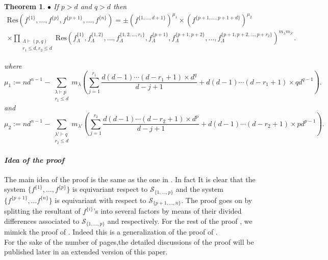 \documentclass[12pt,a4paper,reqno]{amsart}
\newtheorem{theorem}{Theorem}[section]
\theoremstyle{definition}
\theoremstyle{remark}
\numberwithin{equation}{section}
\newcommand{\Res}{\mathrm{Res}}
\begin{document}
\begin{theorem}
\noindent $\bullet$ If $p> d$ and $q> d$ then
\begin{multline*}
\Res\left(f^{\{1\}},\ldots,f^{\{p\}},f^{\{p+1\}},\ldots,f^{\{n\}}\right)=
 \pm \left(f^{\{1,\ldots,d+1\}}\right)^{\mu_1} \times \left(f^{\{p+1,\ldots,p+1+d\}}\right)^{\mu_2}\\ \times\prod_{\substack{\Lambda\vdash (p,q)\\ r_1\leq d,r_2\leq d}}
\Res\left( f_{\Lambda}^{\{1\}}, f_{\Lambda}^{\{1,2\}}, \ldots, f_{\Lambda}^{\{1,2,\ldots,r_1\}},f_{\Lambda}^{\{p+1\}}, f_{\Lambda}^{\{p+1,p+2\}}, \ldots, f_{\Lambda}^{\{p+1,p+2,\ldots,p+r_2\}} 
\right)^{m_{\lambda}m_{\lambda'}}.
\end{multline*}



where
\begin{equation*}
   \mu_1:=nd^{n-1}-\sum_{ \substack{\lambda\vdash p \\ r_1 \leq d}} m_{\lambda} 
  \left(\sum_{j=1}^{r_1}\dfrac{d(d-1)\cdots(d-r_1+1)\times d^q}{d-j+1}+d(d-1)\cdots(d-r_1+1)\times qd^{q-1} \right).
  \end{equation*}
  and
\begin{equation*}
   \mu_2:=nd^{n-1}-\sum_{ \substack{\lambda'\vdash q \\ r_2 \leq d}} m_{\lambda'} 
  \left(\sum_{j=1}^{r_2}\dfrac{d(d-1)\cdots(d-r_2+1)\times d^p}{d-j+1}+d(d-1)\cdots(d-r_2+1)\times pd^{p-1} \right).
  \end{equation*}

\end{theorem}

\paragraph*{\it {\bf Idea of the proof}}
The main idea of the proof is the same as the one in \cite{BuKa16}. In fact It is clear that the system $\{f^{\{1\}},\ldots, f^{\{p\}} \}$ is equivariant respect to  $\mathcal{S}_{\{1,\ldots,p\}} $ and the system $\{ f^{\{p+1\}},\ldots f^{\{n\}} \}$ is equivariant with respect to $\mathcal{S}_{\{p+1,\ldots,n\}}$. The proof goes on by splitting the resultant of  $f^{{\{i\}}}$'s into several factors by means of their divided differences associated to  $\mathcal{S}_{\{1,\ldots,p\}} $ and respectively. For the rest of the proof , we mimick  the proof of \cite[Theorem 3.3]{BuKa16}. Indeed this is a generalization of the proof of \cite[Theorem 3.3]{BuKa16}. \\
For the sake of the number of pages,the detailed discussions of the proof  will be published later in an extended version of this paper. \\
\end{document}
